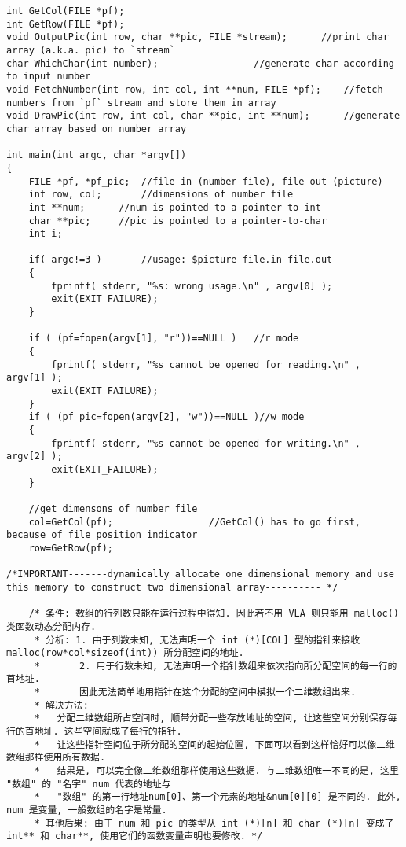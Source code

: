 \begin{solution}
\begin{verbatim}
int GetCol(FILE *pf);			
int GetRow(FILE *pf);
void OutputPic(int row, char **pic, FILE *stream);		//print char array (a.k.a. pic) to `stream`
char WhichChar(int number);					//generate char according to input number
void FetchNumber(int row, int col, int **num, FILE *pf);	//fetch numbers from `pf` stream and store them in array
void DrawPic(int row, int col, char **pic, int **num);		//generate char array based on number array

int main(int argc, char *argv[])
{
	FILE *pf, *pf_pic;	//file in (number file), file out (picture)
	int row, col;		//dimensions of number file
	int **num;		//num is pointed to a pointer-to-int
	char **pic;		//pic is pointed to a pointer-to-char
	int i;

	if( argc!=3 )		//usage: $picture file.in file.out
	{
		fprintf( stderr, "%s: wrong usage.\n" , argv[0] );
		exit(EXIT_FAILURE);
	}

	if ( (pf=fopen(argv[1], "r"))==NULL )	//r mode
	{
		fprintf( stderr, "%s cannot be opened for reading.\n" , argv[1] );
		exit(EXIT_FAILURE);
	}
	if ( (pf_pic=fopen(argv[2], "w"))==NULL )//w mode
	{
		fprintf( stderr, "%s cannot be opened for writing.\n" , argv[2] );
		exit(EXIT_FAILURE);
	}

	//get dimensons of number file
	col=GetCol(pf);		 			//GetCol() has to go first, because of file position indicator
	row=GetRow(pf);

/*IMPORTANT-------dynamically allocate one dimensional memory and use this memory to construct two dimensional array---------- */

	/* 条件: 数组的行列数只能在运行过程中得知. 因此若不用 VLA 则只能用 malloc() 类函数动态分配内存.
	 * 分析: 1. 由于列数未知, 无法声明一个 int (*)[COL] 型的指针来接收 malloc(row*col*sizeof(int)) 所分配空间的地址.
	 *       2. 用于行数未知, 无法声明一个指针数组来依次指向所分配空间的每一行的首地址.
	 *       因此无法简单地用指针在这个分配的空间中模拟一个二维数组出来.
	 * 解决方法:
	 * 	 分配二维数组所占空间时, 顺带分配一些存放地址的空间, 让这些空间分别保存每行的首地址. 这些空间就成了每行的指针.
	 * 	 让这些指针空间位于所分配的空间的起始位置, 下面可以看到这样恰好可以像二维数组那样使用所有数据.
	 * 	 结果是, 可以完全像二维数组那样使用这些数据. 与二维数组唯一不同的是, 这里 "数组" 的 "名字" num 代表的地址与
	 * 	 "数组" 的第一行地址num[0]、第一个元素的地址&num[0][0] 是不同的. 此外, num 是变量, 一般数组的名字是常量.
	 * 其他后果: 由于 num 和 pic 的类型从 int (*)[n] 和 char (*)[n] 变成了 int** 和 char**, 使用它们的函数变量声明也要修改. */


\end{verbatim}
\end{solution}
